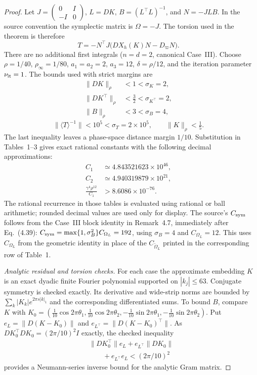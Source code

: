 \begin{proof}
Let $J=\left(\begin{smallmatrix}0&I\\-I&0\end{smallmatrix}\right)$,
$L=DK$, $B=(L^\top L)^{-1}$, and $N=-JLB$.
In the source convention the symplectic matrix is $\Omega=-J$.
The torsion used in the theorem is therefore
\begin{equation}
 T=-N^\top J\bigl(DX_h(K)N-D_\varpi N\bigr).
 \label{eq:HL-torsion}
\end{equation}
There are no additional first integrals ($n=d=2$, canonical Case~III).
Choose $\rho=1/40$, $\rho_\infty=1/80$, $a_1=a_2=2$, $a_3=12$,
$\delta=\rho/12$, and the iteration parameter $\nu_{\rm it}=1$.
The bounds used with strict margins are
\[
 \begin{aligned}
 \|DK\|_\rho&<1<\sigma_K=2,\\
 \|DK^\top\|_\rho&<\tfrac32<\sigma_{K^\top}=2,\\
 \|B\|_\rho&<3<\sigma_B=4,
 \end{aligned}
\]
\[
 \|\langle T\rangle^{-1}\|<10^5<\sigma_T=2\times10^5,
 \qquad \|K\|_\rho<\tfrac15.
\]
The last inequality leaves a phase-space distance margin $1/10$.
Substitution in Tables~1--3 gives exact rational constants with the
following decimal approximations:
\begin{equation}
 \begin{aligned}
 C_1&\simeq4.843521623\times10^{46},\\
 C_2&\simeq4.940319879\times10^{21},\\
 \frac{\gamma^4\rho^{12}}{C_1}&>8.6086\times10^{-76}.
 \end{aligned}
 \label{eq:HL-evaluated-constants}
\end{equation}
The rational recurrence in those tables is evaluated using rational or
ball arithmetic; rounded decimal values are used only for display. The
source's $C_{\rm sym}$ follows from the Case~III block identity in
Remark~4.7, immediately after Eq.~(4.39):
$C_{\rm sym}=\max\{1,\sigma_B^2\}C_{\Omega_L}=192$,
using $\sigma_B=4$ and $C_{\Omega_L}=12$.
This uses $C_{\Omega_L}$ from the geometric identity in place of the
$C_{\widetilde\Omega_L}$ printed in the corresponding row of Table~1.

\emph{Analytic residual and torsion checks.}
For each case the approximate embedding $K$ is an exact dyadic finite
Fourier polynomial supported on $|k_j|\leq63$.
Conjugate symmetry is checked exactly.
Its derivative and wide-strip norms are bounded by
$\sum_k|K_k|e^{2\pi s|k|_1}$ and the corresponding differentiated sums.
To bound $B$, compare $K$ with
$K_0=(\frac1{10}\cos2\pi\theta_1,
\frac1{10}\cos2\pi\theta_2,-\frac1{10}\sin2\pi\theta_1,
-\frac1{10}\sin2\pi\theta_2)$.
Put $e_L=\|D(K-K_0)\|$ and $e_{L^\top}=\|D(K-K_0)^\top\|$.
As $DK_0^\top DK_0=(2\pi/10)^2I$ exactly, the checked inequality
\[
 \begin{aligned}
 &\|DK_0^\top\|e_L+e_{L^\top}\|DK_0\|\\
 &\qquad+e_{L^\top}e_L<(2\pi/10)^2
 \end{aligned}
\]
provides a Neumann-series inverse bound for the analytic Gram matrix.


\end{proof}
